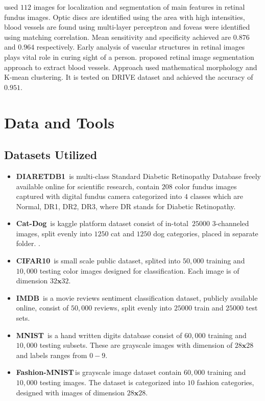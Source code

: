\documentclass[12pt,a4paper,titlepage]{report}
\begin{document}
\noindent \cite{sinthanayothin1999automated} used $112$ images for localization and segmentation of main features in retinal fundus images. Optic discs are identified using the area with high intensities, blood vessels are found using multi-layer perceptron and foveas were identified using matching correlation. Mean sensitivity and specificity achieved are $0.876$ and $0.964$ respectively.
Early analysis of vascular structures in retinal images plays vital role in curing sight of a person. \cite{hassan2015retinal} proposed retinal image segmentation approach to extract blood vessels. Approach used mathematical morphology and K-mean clustering. It is tested on DRIVE dataset and achieved the accuracy of $0.951$.


\chapter{Data and Tools}
\section{Datasets Utilized}
\begin{itemize}
\item\textbf{DIARETDB1}\, is multi-class Standard Diabetic Retinopathy Database freely available online for scientific research, contain $208$ color fundus images captured with digital fundus camera categorized into $4$ classes which are Normal, DR1, DR2, DR3, where DR stands for Diabetic Retinopathy.
\item\textbf{Cat-Dog}\, is kaggle platform dataset consist of in-total  \,$25000$ $3$-channeled images, split evenly into $1250$ cat and $1250$ dog categories, placed in separate folder.     .
\item\textbf{CIFAR10}\, is small scale public dataset, splited into $50,000$ training and $10,000$ testing color images designed for classification. Each image is of dimension $32\mathbf{x}32$.
\item\textbf{IMDB}\, is a movie reviews sentiment classification dataset, publicly available online, consist of  $50,000$  reviews, split evenly into $25000$ train and $25000$ test sets. 
\item\textbf{MNIST}\, is a hand written digits database consist of $60,000$ training and $10,000$ testing subsets. These are grayscale images with dimension of $28\mathbf{x}28$ and labels ranges from $0-9$.
\item\textbf{Fashion-MNIST}\,is grayscale image dataset contain $60,000$ training and $10,000$ testing images. The dataset is categorized into $10$ fashion categories, designed with images of dimension $28\mathbf{x}28$. 	  
\end{itemize}
\end{document}
